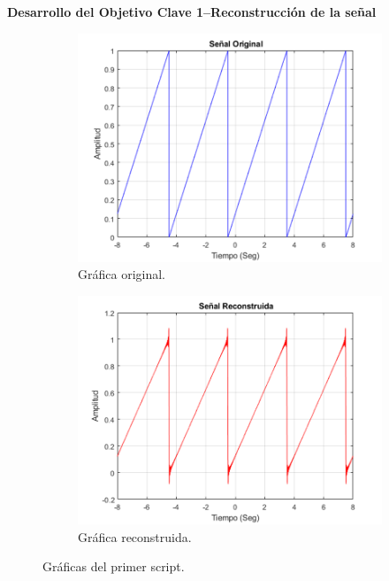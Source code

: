 \documentclass[11pt,a4paper,twocolumn]{article}
\begin{document}
    \textbf{Desarrollo del Objetivo Clave 1--Reconstrucción de la señal}

    \begin{figure}[H]
        \centering 
        \begin{subfigure}[h]{0.45\linewidth}
            \includegraphics[width=\linewidth]{img/figure2_A.png}
            \caption{Gráfica original.}
            \label{figure2_A}
        \end{subfigure}
        \begin{subfigure}[h]{0.45\linewidth}
            \includegraphics[width=\linewidth]{img/figure2_B.png}
            \caption{Gráfica reconstruida.}
            \label{figure2_B}
        \end{subfigure}
        \caption{Gráficas del primer script.}
        \label{figure2}
    \end{figure}
\end{document}
